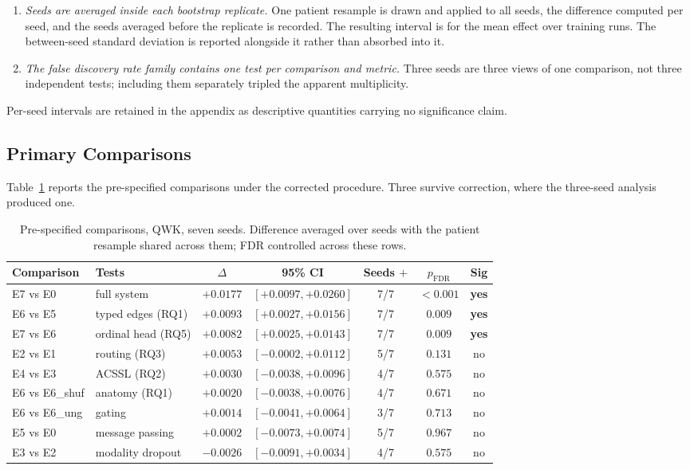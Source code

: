 \documentclass[12pt,a4paper]{report}
\begin{document}
\begin{enumerate}
  \item \emph{Seeds are averaged inside each bootstrap replicate.} One patient
  resample is drawn and applied to all seeds, the difference computed per seed,
  and the seeds averaged before the replicate is recorded. The resulting interval
  is for the mean effect over training runs. The between-seed standard deviation
  is reported alongside it rather than absorbed into it.

  \item \emph{The false discovery rate family contains one test per comparison
  and metric.} Three seeds are three views of one comparison, not three
  independent tests; including them separately tripled the apparent multiplicity.
\end{enumerate}

Per-seed intervals are retained in the appendix as descriptive quantities
carrying no significance claim.

\subsection{Primary Comparisons}

Table~\ref{tab:comparisons} reports the pre-specified comparisons under the
corrected procedure. Three survive correction, where the three-seed
analysis produced one.

\begin{table}[htbp]
\centering
\small
\caption{Pre-specified comparisons, QWK, seven seeds. Difference averaged
over seeds with the patient resample shared across them; FDR controlled
across these rows.}
\label{tab:comparisons}
\begin{tabular}{llccccc}
\toprule
Comparison & Tests & $\Delta$ & 95\% CI & Seeds $+$ & $p_{\mathrm{FDR}}$ & Sig \\
\midrule
E7 vs E0 & full system & $+0.0177$ & $[+0.0097, +0.0260]$ & 7/7 & $\mathbf{<0.001}$ & \textbf{yes} \\
E6 vs E5 & typed edges (RQ1) & $+0.0093$ & $[+0.0027, +0.0156]$ & 7/7 & $\mathbf{0.009}$ & \textbf{yes} \\
E7 vs E6 & ordinal head (RQ5) & $+0.0082$ & $[+0.0025, +0.0143]$ & 7/7 & $\mathbf{0.009}$ & \textbf{yes} \\
\midrule
E2 vs E1 & routing (RQ3) & $+0.0053$ & $[-0.0002, +0.0112]$ & 5/7 & $0.131$ & no \\
E4 vs E3 & ACSSL (RQ2) & $+0.0030$ & $[-0.0038, +0.0096]$ & 4/7 & $0.575$ & no \\
E6 vs E6\_shuf & anatomy (RQ1) & $+0.0020$ & $[-0.0038, +0.0076]$ & 4/7 & $0.671$ & no \\
E6 vs E6\_ung & gating & $+0.0014$ & $[-0.0041, +0.0064]$ & 3/7 & $0.713$ & no \\
E5 vs E0 & message passing & $+0.0002$ & $[-0.0073, +0.0074]$ & 5/7 & $0.967$ & no \\
E3 vs E2 & modality dropout & $-0.0026$ & $[-0.0091, +0.0034]$ & 4/7 & $0.575$ & no \\
\bottomrule
\end{tabular}
\end{table}
\end{document}
